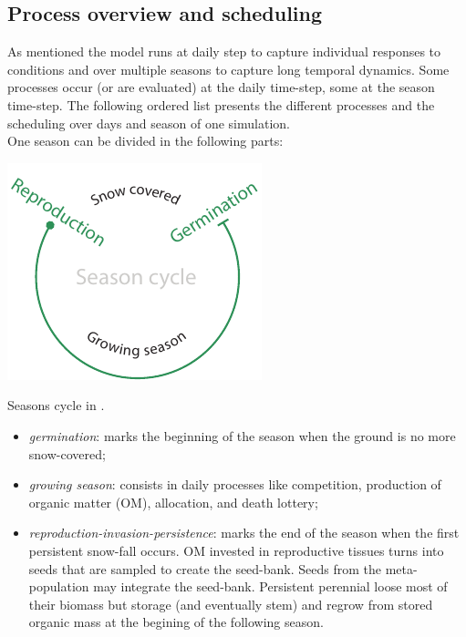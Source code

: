 
\subsection{Process overview and scheduling}

As mentioned the model runs at daily step to capture individual responses to conditions and over multiple seasons to capture long temporal dynamics. Some processes occur (or are evaluated) at the daily time-step, some at the season time-step. The following ordered list presents the different processes and the scheduling over days and season of one simulation.\\
\indent One season can be divided in the following parts:
\begin{marginfigure}
\includegraphics{./Figures/season_cycle_m.pdf}
\caption{Seasons cycle in \model.}
\end{marginfigure}
\begin{itemize}
\setlength\itemsep{0em}
\item \textit{germination}: marks the beginning of the season when the ground is no more snow-covered;
\item \textit{growing season}: consists in daily processes like competition, production of organic matter (OM), allocation, and death lottery;
\item \textit{reproduction-invasion-persistence}: marks the end of the season when the first persistent snow-fall occurs. OM invested in reproductive tissues turns into seeds that are sampled to create the seed-bank. Seeds from the meta-population may integrate the seed-bank. Persistent perennial loose most of their biomass but storage (and eventually stem) and regrow from stored organic mass at the begining of the following season.
\end{itemize}

